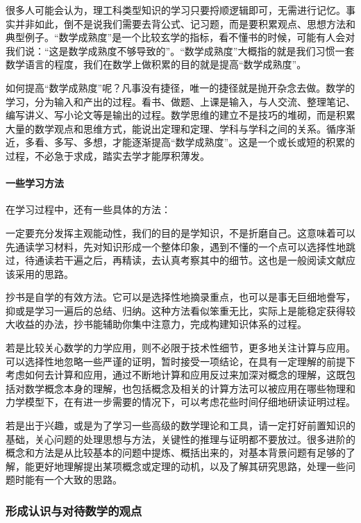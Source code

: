 很多人可能会认为，理工科类型知识的学习只要捋顺逻辑即可，无需进行记忆。事实并非如此，倒不是说我们需要去背公式、记习题，而是要积累观点、思想方法和典型例子。“数学成熟度”是一个比较玄学的指标，看不懂书的时候，可能有人会对我们说：“这是数学成熟度不够导致的”。“数学成熟度”大概指的就是我们习惯一套数学语言的程度，我们在数学上做积累的目的就是提高“数学成熟度”。

如何提高“数学成熟度”呢？凡事没有捷径，唯一的捷径就是抛开杂念去做。数学的学习，分为输入和产出的过程。看书、做题、上课是输入，与人交流、整理笔记、编写讲义、写小论文等是输出的过程。数学思维的建立不是技巧的堆砌，而是积累大量的数学观点和思维方式，能说出定理和定理、学科与学科之间的关系。循序渐近，多看、多写、多想，才能逐渐提高“数学成熟度”。这是一个或长或短的积累的过程，不必急于求成，踏实去学才能厚积薄发。

\paragraph{一些学习方法}

在学习过程中，还有一些具体的方法：

一定要充分发挥主观能动性，我们的目的是学知识，不是折磨自己。这意味着可以先通读学习材料，先对知识形成一个整体印象，遇到不懂的一个点可以选择性地跳过，待通读若干遍之后，再精读，去认真考察其中的细节。这也是一般阅读文献应该采用的思路。

抄书是自学的有效方法。它可以是选择性地摘录重点，也可以是事无巨细地誊写，抑或是学习一遍后的总结、归纳。这种方法看似笨重无比，实际上是能稳定获得较大收益的办法，抄书能辅助你集中注意力，完成构建知识体系的过程。

若是比较关心数学的力学应用，则不必限于技术性细节，更多地关注计算与应用。可以选择性地忽略一些严谨的证明，暂时接受一项结论，在具有一定理解的前提下考虑如何去计算和应用，通过不断地计算和应用反过来加深对概念的理解，这既包括对数学概念本身的理解，也包括概念及相关的计算方法可以被应用在哪些物理和力学模型下，在有进一步需要的情况下，可以考虑花些时间仔细地研读证明过程。

若是出于兴趣，或是为了学习一些高级的数学理论和工具，请一定打好前置知识的基础，关心问题的处理思想与方法，关键性的推理与证明都不要放过。很多进阶的概念和方法是从比较基本的问题中提炼、概括出来的，对基本背景问题有足够的了解，能更好地理解提出某项概念或定理的动机，以及了解其研究思路，处理一些问题时能有一个大致的思路。

\subsubsection{形成认识与对待数学的观点}

